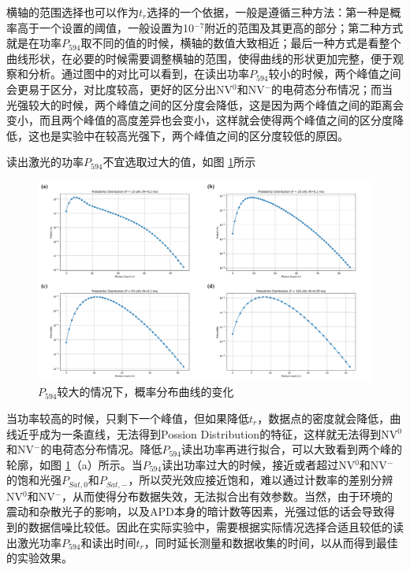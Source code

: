 \documentclass[type = bachelor]{whu-thesis}
\begin{document}
横轴的范围选择也可以作为$t_r$选择的一个依据，一般是遵循三种方法：第一种是概率高于一个设置的阈值，一般设置为10$^{-7}$附近的范围及其更高的部分；第二种方式就是在功率$P_{594}$取不同的值的时候，横轴的数值大致相近；最后一种方式是看整个曲线形状，在必要的时候需要调整横轴的范围，使得曲线的形状更加完整，便于观察和分析。通过图中的对比可以看到，在读出功率$P_{594}$较小的时候，两个峰值之间会更易于区分，对比度较高，更好的区分出NV$^0$和NV$^-$的电荷态分布情况；而当光强较大的时候，两个峰值之间的区分度会降低，这是因为两个峰值之间的距离会变小，而且两个峰值的高度差异也会变小，这样就会使得两个峰值之间的区分度降低，这也是实验中在较高光强下，两个峰值之间的区分度较低的原因。

读出激光的功率$P_{594}$不宜选取过大的值，如图 \ref{fig: P_var_dist_high}所示
\begin{figure}
  \centering
  \includegraphics[width=1.0\textwidth]{figures/Chapter 5/P_var_dist_high.png}
  \caption[$P_{594}$较大的情况下，概率分布曲线的变化]{$P_{594}$较大的情况下，概率分布曲线的变化}
  \label{fig: P_var_dist_high}
\end{figure}
当功率较高的时候，只剩下一个峰值，但如果降低$t_r$，数据点的密度就会降低，曲线近乎成为一条直线，无法得到Possion Distribution的特征，这样就无法得到NV$^0$和NV$^-$的电荷态分布情况。降低$P_{594}$读出功率再进行拟合，可以大致看到两个峰的轮廓，如图 \ref{fig: P_var_dist_high}（a）所示。当$P_{594}$读出功率过大的时候，接近或者超过NV$^0$和NV$^-$的饱和光强$P_{Sat,0}$和$P_{Sat,-}$，所以荧光效应接近饱和，难以通过计数率的差别分辨NV$^0$和NV$^-$，从而使得分布数据失效，无法拟合出有效参数。当然，由于环境的震动和杂散光子的影响，以及APD本身的暗计数等因素，光强过低的话会导致得到的数据信噪比较低。因此在实际实验中，需要根据实际情况选择合适且较低的读出激光功率$P_{594}$和读出时间$t_r$，同时延长测量和数据收集的时间，以从而得到最佳的实验效果。
\end{document}
